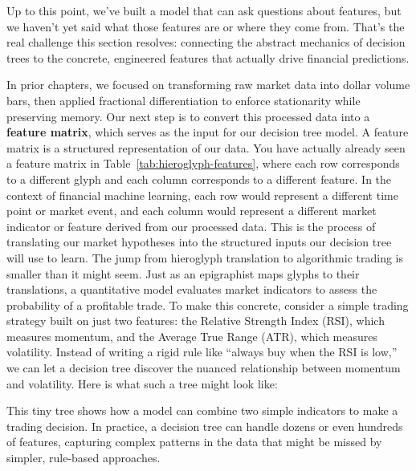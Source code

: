 Up to this point, we've built a model that can ask questions about features, but we haven't yet said what those features are or where they come from. 
That's the real challenge this section resolves: connecting the abstract mechanics of decision trees to the concrete, engineered features that actually drive financial predictions.

In prior chapters, we focused on transforming raw market data into dollar volume bars, then applied fractional differentiation to enforce stationarity while preserving memory.
Our next step is to convert this processed data into a \textbf{feature matrix}, which serves as the input for our decision tree model. 
A feature matrix is a structured representation of our data. You have actually already seen a feature matrix in Table~\ref{tab:hieroglyph-features}, where each row corresponds to a different glyph and each column corresponds to a different feature.
In the context of financial machine learning, each row would represent a different time point or market event, and each column would represent a different market indicator or feature derived from our processed data.
This is the process of translating our market hypotheses into the structured inputs our decision tree will use to learn.
The jump from hieroglyph translation to algorithmic trading is smaller than it might seem.
Just as an epigraphist maps glyphs to their translations, a quantitative model evaluates market indicators to assess the probability of a profitable trade.
To make this concrete, consider a simple trading strategy built on just two features: the Relative Strength Index (RSI), which measures momentum, and the Average True Range (ATR), which measures volatility.
Instead of writing a rigid rule like ``always buy when the RSI is low,'' we can let a decision tree discover the nuanced relationship between momentum and volatility. Here is what such a tree might look like:

\begin{center}
\end{center}

This tiny tree shows how a model can combine two simple indicators to make a trading decision. 
In practice, a decision tree can handle dozens or even hundreds of features, capturing complex patterns in the data that might be missed by simpler, rule-based approaches.


